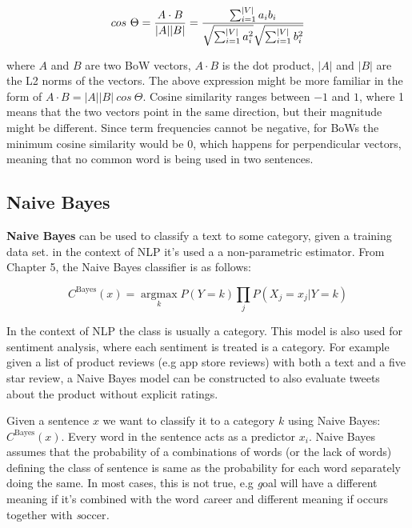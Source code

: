 \[cos\ \Theta = {A \cdot B \over |A| |B|} = {\sum_{i=1}^{|V|} a_ib_i \over \sqrt {\sum_{i=1}^{|V|} a_i^2} \sqrt {\sum_{i=1}^{|V|} b_i^2}}\]

where \(A\) and \(B\) are two BoW vectors, \(A \cdot B\) is the dot product, \(|A|\) and \(|B|\) are the L2 norms of the vectors. The above expression might be more familiar in the form of \(A \cdot B = |A| |B|\ cos\ \Theta\). Cosine similarity ranges between \(-1\) and \(1\), where 1 means that the two vectors point in the same direction, but their magnitude might be different. Since term frequencies cannot be negative, for BoWs the minimum cosine similarity would be 0, which happens for perpendicular vectors, meaning that no common word is being used in two sentences.

\subsection{Naive Bayes}

\textbf{Naive Bayes} can be used to classify a text to some category, given a training data set. in the context of NLP it's used a a non-parametric estimator. From Chapter 5, the Naive Bayes classifier is as follows:

\begin{equation}{\displaystyle C^{\text{Bayes}}(x)={\underset {k}{\operatorname {argmax} }} P (Y=k)\prod _{j} P(X_j = x_j|Y=k)}\tag{10.1}\end{equation}

In the context of NLP the class is usually a category. This model is also used for sentiment analysis, where each sentiment is treated is a category. For example given a list of product reviews (e.g app store reviews) with both a text and a five star review, a Naive Bayes model can be constructed to also evaluate tweets about the product without explicit ratings.

Given a sentence \(x\) we want to classify it to a category \(k\) using Naive Bayes: \(\displaystyle C^{\text{Bayes}}(x)\). Every word in the sentence acts as a predictor \(x_i\).  Naive Bayes assumes that the probability of a combinations of words (or the lack of words) defining the class of sentence is same as the probability for each word separately doing the same. In most cases, this is not true, e.g \textit{g}oal\textit{ }will have a different meaning if it's combined with the word \textit{c}areer\textit{ }and different meaning if occurs together with \textit{s}occer\textit{.}

